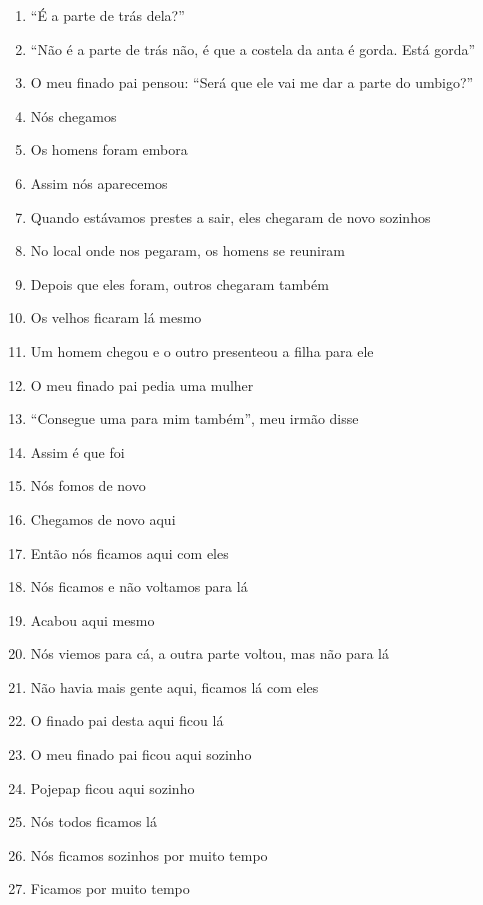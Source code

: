 \begin{enumerate}
 \item ``É a parte de trás dela?''
 \item ``Não é a parte de trás não, é que a costela da anta é gorda. Está gorda''
 \item O meu finado pai pensou: ``Será que ele vai me dar a parte do umbigo?''
 \item Nós chegamos
 \item Os homens foram embora
 \begin{center}\end{center}
 \item Assim nós aparecemos
 \item Quando estávamos prestes a sair, eles chegaram de novo sozinhos
 \item No local onde nos pegaram, os homens se reuniram
 \item Depois que eles foram, outros chegaram também
 \item Os velhos ficaram lá mesmo
 \item Um homem chegou e o outro presenteou a filha para ele
 \item O meu finado pai pedia uma mulher
 \item ``Consegue uma para mim também'', meu irmão disse
 \item Assim é que foi
 \item Nós fomos de novo
 \item Chegamos de novo aqui
 \item Então nós ficamos aqui com eles
 \item Nós ficamos e não voltamos para lá
 \item Acabou aqui mesmo
 \begin{center}\end{center}
 \item Nós viemos para cá, a outra parte voltou, mas não para lá
 \item Não havia mais gente aqui, ficamos lá com eles
 \item O finado pai desta aqui ficou lá
 \item O meu finado pai ficou aqui sozinho
 \item Pojepap ficou aqui sozinho
 \item Nós todos ficamos lá
 \item Nós ficamos sozinhos por muito tempo
 \item Ficamos por muito tempo
 \begin{center}\end{center}

\end{enumerate}
